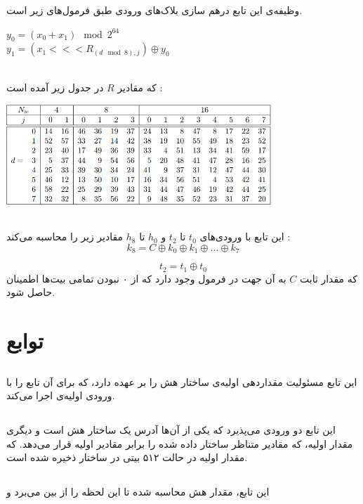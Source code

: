 وظیفه‌ی این تابع درهم سازی بلاک‌های ورودی طبق فرمول‌های زیر است.
\begin{center}
	$y_0 = (x_0 + x_1) \mod 2^{64}$ \\
	$ y_1 = (x_1 <<< R_{(d \mod 8), j}) \oplus y_0$
\end{center}
\\
که مقادیر $ R $ در جدول زیر آمده است :

\begin{center}
	\includegraphics[width=10cm]{images/MIX1.png}
\end{center}




\subsection{}
\label{subsec:TFBIG-INIT}
این تابع با ورودی‌های $ t_0 $ تا $ t_2 $ و $h_0 $ تا $ h_8 $ مقادیر زیر را محاسبه می‌کند :
$$
k_8 = C \oplus k_0 \oplus k_1 \oplus ... \oplus k_7
$$

$$
	t_2 = t_1 \oplus t_0
$$
 که مقدار ثابت $ C $ به آن جهت در فرمول وجود دارد که از ۰ نبودن تمامی بیت‌ها اطمینان حاصل شود.
\section{ توابع}

\subsection{}
\label{subsec:sph-skein512-init}
این تابع مسئولیت مقداردهی اولیه‌ی ساختار هش را بر عهده دارد، که برای آن تابع \hyperref[subsec:skein-big-init]{} را با ورودی‌ اولیه‌ی  اجرا می‌کند.
\subsection{}
\label{subsec:skein-big-init}

این تابع دو ورودی می‌پذیرد که یکی از آن‌ها آدرس یک ساختار هش است و دیگری مقدار اولیه، که مقادیر متناظر ساختار داده شده را برابر مقادیر اولیه قرار می‌دهد.
که مقدار اولیه در حالت ۵۱۲ بیتی در ساختار  ذخیره شده ‌است.

\subsection{}
\label{subsec:sph-skein512}
این تابع، مقدار هش محاسبه شده تا این لحظه را از بین می‌برد و 